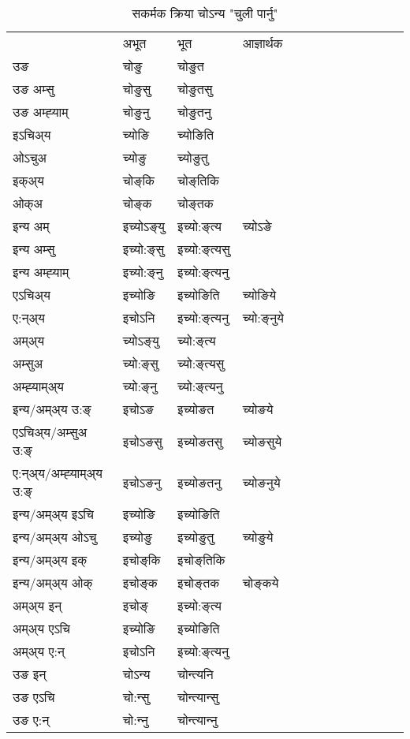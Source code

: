 \begin{table}[H]
\label{oŋ.vt} \centering
\caption{सकर्मक क्रिया  चोऽन्य  "चुली पार्नु"  }
\begin{tabular}{l|l|l|l|l|l|l|l|l|l|l|l|l}  \toprule
&अभूत & भूत & आज्ञार्थक \\ 
उङ &चोङु &चोङुत \\ 
उङ अम्सु &चोङुसु &चोङुतसु \\ 
उङ अम्ह्‍याम् &चोङुनु &चोङुतनु \\ 
इऽचिअ्य &च्योङि &च्योङिति   \\ 
ओऽचुअ &च्योङु &च्योङुतु   \\ 
इक्अ्य &चोङ्‌कि &चोङ्‌तिकि   \\ 
ओक्अ &चोङ्‌क &चोङ्‌तक   \\ 
इन्य अम् & इच्योऽङ्‌यु  & इच्यो:ङ्‌त्य &च्योऽङे  \\ 
इन्य अम्सु & इच्यो:ङ्‌सु  & इच्यो:ङ्‌त्यसु   \\ 
इन्य अम्ह्‍याम् & इच्यो:ङ्‌नु  & इच्यो:ङ्‌त्यनु   \\ 
एऽचिअ्य & इच्योङि & इच्योङिति &च्योङिये    \\ 
ए:न्अ्य & इचोऽनि  & इच्यो:ङ्‌त्यनु &च्यो:ङ्‌नुये  \\ 
अम्अ्य & च्योऽङ्‌यु  & च्यो:ङ्‌त्य  \\ 
अम्सुअ & च्यो:ङ्‌सु & च्यो:ङ्‌त्यसु  \\ 
अम्ह्‍याम्अ्य & च्यो:ङ्‌नु  & च्यो:ङ्‌त्यनु \\ 
\midrule
इन्य/अम्अ्य उ:ङ्‌&इचोऽङ & इच्योङत &च्योङये \\ 
एऽचिअ्य/अम्सुअ उ:ङ्‌ &इचोऽङसु & इच्योङतसु &च्योङसुये \\ 
ए:न्अ्य/अम्ह्‍याम्अ्य उ:ङ्‌ &इचोऽङनु & इच्योङतनु &च्योङनुये \\ 
इन्य/अम्अ्य इऽचि & इच्योङि & इच्योङिति    \\ 
इन्य/अम्अ्य ओऽचु & इच्योङु & इच्योङुतु  &च्योङुये  \\ 
इन्य/अम्अ्य इक् & इचोङ्‌कि & इचोङ्‌तिकि   \\ 
इन्य/अम्अ्य ओक् & इचोङ्‌क & इचोङ्‌तक  &चोङ्‌कये  \\ 
अम्अ्य इन् & इचोङ्‌ & इच्यो:ङ्‌त्य   \\ 
अम्अ्य एऽचि & इच्योङि & इच्योङिति    \\ 
अम्अ्य ए:न् & इचोऽनि  & इच्यो:ङ्‌त्यनु  \\ 
\midrule
उङ इन् & चोऽन्य  & चोन्त्यनि  \\ 
उङ एऽचि & चो:न्सु  & चोन्त्यान्सु   \\ 
उङ ए:न्& चो:न्‍नु  & चोन्त्यान्‍नु   \\ 
\bottomrule
\end{tabular}
\end{table}


